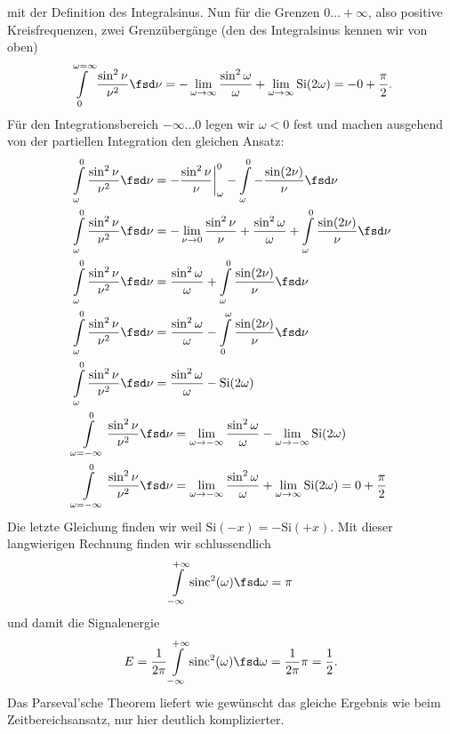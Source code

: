 \begin{ExCalc}
mit der Definition des Integralsinus.
Nun für die Grenzen $0\dots +\infty$, also positive Kreisfrequenzen, zwei
Grenzübergänge (den des Integralsinus kennen wir von oben)
\begin{align}
\int\limits_0^{\omega=\infty} \frac{\sin^2 \nu}{\nu^2} \fsd \nu  =
- \lim_{\omega\to\infty}\frac{\sin^2 \omega}{\omega} + \lim_{\omega\to\infty}
\mathrm{Si}(2 \omega) = -0 + \frac{\pi}{2}.
\end{align}
%
Für den Integrationsbereich $-\infty\dots 0$ legen wir $\omega<0$ fest und machen
ausgehend von der partiellen Integration den gleichen Ansatz:
\begin{align}
&\int\limits_{\omega}^0 \frac{\sin^2 \nu}{\nu^2} \fsd \nu  =
-\frac{\sin^2 \nu}{\nu}\bigg|_{\omega}^0
- \int\limits_{\omega}^0 -\frac{\sin(2 \nu)}{\nu} \fsd \nu\\
&\int\limits_{\omega}^0 \frac{\sin^2 \nu}{\nu^2} \fsd \nu  =
-\lim_{\nu\to 0}\frac{\sin^2 \nu}{\nu}
+\frac{\sin^2 \omega}{\omega}
+ \int\limits_{\omega}^0 \frac{\sin(2 \nu)}{\nu} \fsd \nu\\
&\int\limits_{\omega}^0 \frac{\sin^2 \nu}{\nu^2} \fsd \nu  =
\frac{\sin^2 \omega}{\omega}
+ \int\limits_{\omega}^0 \frac{\sin(2 \nu)}{\nu} \fsd \nu\\
&\int\limits_{\omega}^0 \frac{\sin^2 \nu}{\nu^2} \fsd \nu  =
\frac{\sin^2 \omega}{\omega}
-\int\limits_{0}^\omega \frac{\sin(2 \nu)}{\nu} \fsd \nu\\
&\int\limits_{\omega}^0 \frac{\sin^2 \nu}{\nu^2} \fsd \nu  =
\frac{\sin^2 \omega}{\omega}
-\mathrm{Si}(2\omega)\\
&\int\limits_{\omega=-\infty}^0 \frac{\sin^2 \nu}{\nu^2} \fsd \nu  =
\lim_{\omega \to -\infty}\frac{\sin^2 \omega}{\omega}
-\lim_{\omega \to -\infty}\mathrm{Si}(2\omega)\\
&\int\limits_{\omega=-\infty}^0 \frac{\sin^2 \nu}{\nu^2} \fsd \nu  =
\lim_{\omega \to -\infty}\frac{\sin^2 \omega}{\omega}
+\lim_{\omega \to \infty}\mathrm{Si}(2\omega) = 0 + \frac{\pi}{2}
\end{align}
%
Die letzte Gleichung finden wir weil $\mathrm{Si}(-x)=-\mathrm{Si}(+x)$.
Mit dieser langwierigen Rechnung finden wir schlussendlich
\begin{align}
\int\limits_{-\infty}^{+\infty} \mathrm{sinc}^2(\omega) \fsd \omega = \pi
\end{align}
und damit die Signalenergie
\begin{align}
E = \frac{1}{2\pi}\int\limits_{-\infty}^{+\infty} \mathrm{sinc}^2(\omega) \fsd \omega
= \frac{1}{2\pi} \pi = \frac{1}{2}.
\end{align}
Das Parseval'sche Theorem liefert wie gewünscht das gleiche Ergebnis wie beim
Zeitbereichsansatz, nur hier deutlich komplizierter.


\end{ExCalc}

